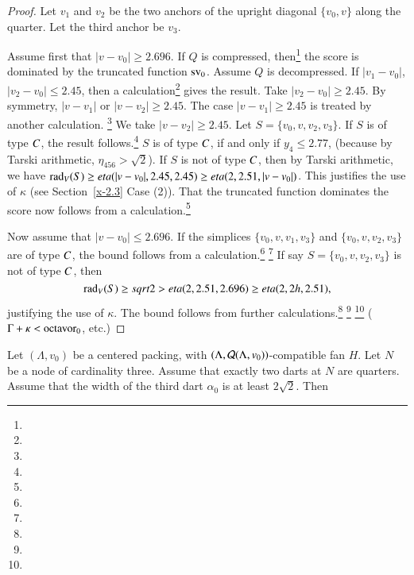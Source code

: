 \begin{proof}
Let $v_1$ and $v_2$ be the two anchors of the upright diagonal $\{v_0,v\}$
along the quarter. Let the third anchor be $v_3$.

Assume first that $|v-v_0|\ge 2.696$. If $Q$ is compressed,
then\footnote{} %
the score is dominated by the truncated
function ${\operatorname{sv}}_0$.  Assume $Q$ is decompressed. If $|v_1-v_0|$,
$|v_2-v_0|\le 2.45$, then a calculation\footnote{} %
gives the result. Take $|v_2-v_0|\ge
2.45$.  By symmetry, $|v-v_1|$ or $|v-v_2|\ge 2.45$. The case
$|v-v_1|\ge2.45$ is treated by another calculation.%
\footnote{} %
We take
$|v-v_2|\ge2.45$. Let $S=\{v_0,v,v_2,v_3\}$. If $S$ is of type $C$,
the result follows.\footnote{} %
$S$ is of type $C$, if and only if $y_4\le 2.77$, (because
by Tarski arithmetic, $\eta_{456}>\sqrt2$).
If $S$ is  not of type $C$, then by Tarski arithmetic,
we have $\operatorname{rad}_V(S) \ge eta(|v-v_0|,2.45,2.45)\ge eta(2,2.51,|v-v_0|)$.
This justifies the use of $\kappa$ (see Section~\ref{x-2.3}
Case (2)). That the truncated function dominates the score now
follows from a calculation.\footnote{} %

Now assume that $|v-v_0|\le 2.696$. If the simplices $\{v_0,v,v_1,v_3\}$
and $\{v_0,v,v_2,v_3\}$ are of type $C$, the bound follows from a
calculation.\footnote{} %
\footnote{} %
If say  $S=\{v_0,v,v_2,v_3\}$ is not of type $C$,
then
    $$\operatorname{rad}_V(S)\ge sqrt2>  eta(2,2.51,2.696)\ge eta(2,2h,2.51),$$
justifying the use of $\kappa$. The bound follows from further
calculations.\footnote{} %
\footnote{} %
\footnote{} %
($\Gamma+\kappa <\operatorname{octavor}_0$,
etc.)
\end{proof}


\begin{lemma}
    \label{lemma:unerased}
Let $(\Lambda,v_0)$ be a centered packing, 
with $(\Lambda,{\mathcal Q}(\Lambda,v_0))$-compatible fan $H$.
Let $N$ be a node
of cardinality three.  Assume that exactly two darts at $N$
are quarters.  Assume that the width of the third dart $\alpha_0$
is at least $2\sqrt2$.
Then 
\end{lemma}

